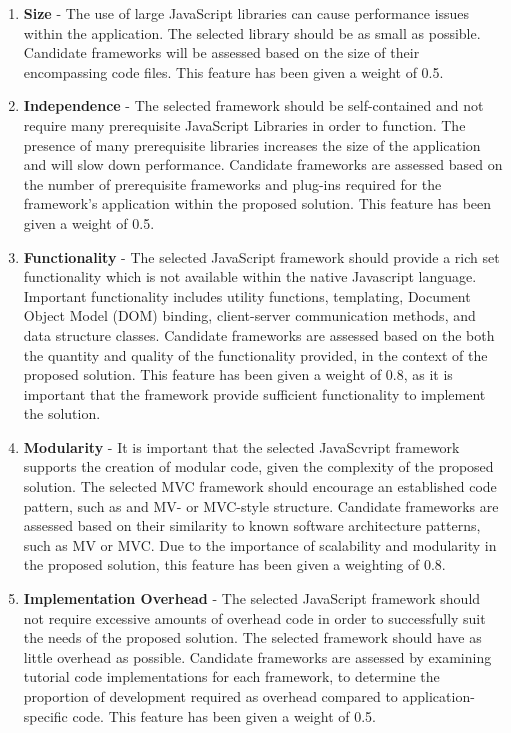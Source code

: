 \documentclass{report}
\begin{document}
\begin{enumerate}

\item \textbf{Size} - The use of large JavaScript libraries can cause performance issues within the application. The selected library should be as small as possible. Candidate frameworks will be assessed based on the size of their encompassing code files. This feature has been given a weight of 0.5.

\item \textbf{Independence} - The selected framework should be self-contained and not require many prerequisite JavaScript Libraries in order to function. The presence of many prerequisite libraries increases the size of the application and will slow down performance. Candidate frameworks are assessed based on the number of prerequisite frameworks and plug-ins required for the framework's application within the proposed solution. This feature has been given a weight of 0.5.

\item \textbf{Functionality} - The selected JavaScript framework should provide a rich set functionality which is not available within the native Javascript language. Important functionality includes utility functions, templating, Document Object Model (DOM) binding, client-server communication methods, and data structure classes. Candidate frameworks are assessed based on the both the quantity and quality of the functionality provided, in the context of the proposed solution. This feature has been given a weight of 0.8, as it is important that the framework provide sufficient functionality to implement the solution.

\item \textbf{Modularity} - It is important that the selected JavaScvript framework supports the creation of modular code, given the complexity of the proposed solution. The selected MVC framework should encourage an established code pattern, such as and MV- or MVC-style structure. Candidate frameworks are assessed based on their similarity to known software architecture patterns, such as MV or MVC. Due to the importance of scalability and modularity in the proposed solution, this feature has been given a weighting of 0.8.

\item \textbf{Implementation Overhead} - The selected JavaScript framework should not require excessive amounts of overhead code in order to successfully suit the needs of the proposed solution. The selected framework should have as little overhead as possible. Candidate frameworks are assessed by examining tutorial code implementations for each framework, to determine the proportion of development required as overhead compared to application-specific code. This feature has been given a weight of 0.5.

\end{enumerate}
\end{document}
